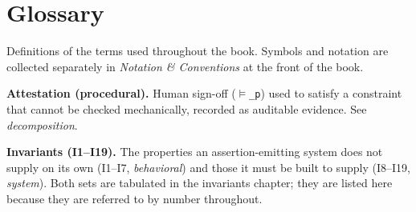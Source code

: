 \chapter{Glossary}
\label{ch:glossary}


Definitions of the terms used throughout the book. Symbols and notation are
collected separately in \emph{Notation \& Conventions} at the front of the book.

\textbf{Attestation (procedural).} Human sign-off (\texttt{$\vDash$\_\allowbreak{}p}) used to satisfy a constraint
that cannot be checked mechanically, recorded as auditable evidence. See
\emph{decomposition}.

\textbf{Invariants (I1--I19).} The properties an assertion-emitting system does not
supply on its own (I1--I7, \emph{behavioral}) and those it must be built to supply
(I8--I19, \emph{system}). Both sets are tabulated in the invariants chapter; they are
listed here because they are referred to by number throughout.

